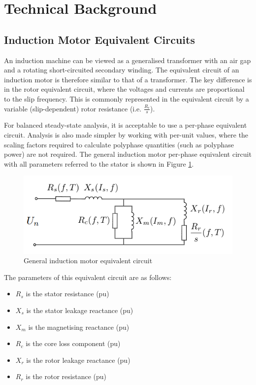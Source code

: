 \documentclass{article}
\begin{document}
\newpage
\section{Technical Background}

\subsection{Induction Motor Equivalent Circuits}

An induction machine can be viewed as a generalised transformer with an air gap and a rotating short-circuited secondary winding. The equivalent circuit of an induction motor is therefore similar to that of a transformer. The key difference is in the rotor equivalent circuit, where the voltages and currents are proportional to the slip frequency. This is commonly represented in the equivalent circuit by a variable (slip-dependent) rotor resistance (i.e. $\frac{R_{r}}{s}$).

For balanced steady-state analysis, it is acceptable to use a per-phase equivalent circuit. Analysis is also made simpler by working with per-unit values, where the scaling factors required to calculate polyphase quantities (such as polyphase power) are not required. The general induction motor per-phase equivalent circuit with all parameters referred to the stator is shown in Figure \ref{fig:general_equiv_circuit}.

\begin{figure}[htp]
\begin{center}
\includegraphics[scale=0.85]{./Figures/General_equiv_circuit.png}
\caption{General induction motor equivalent circuit}
\label{fig:general_equiv_circuit}
\end{center}
\end{figure}

The parameters of this equivalent circuit are as follows:

\begin{itemize}
\item  $R_{s}$ is the stator resistance (pu)
\item $X_{s}$ is the stator leakage reactance (pu)
\item $X_{m}$ is the magnetising reactance (pu) 
\item $R_{c}$ is the core loss component (pu) 
\item $X_{r}$ is the rotor leakage reactance (pu) 
\item $R_{r}$ is the rotor resistance (pu) 
\end{itemize}
\end{document}
